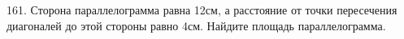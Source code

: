 161. Сторона параллелограмма равна 12см, а расстояние от точки пересечения диагоналей до этой стороны равно 4см. Найдите площадь параллелограмма.\\
